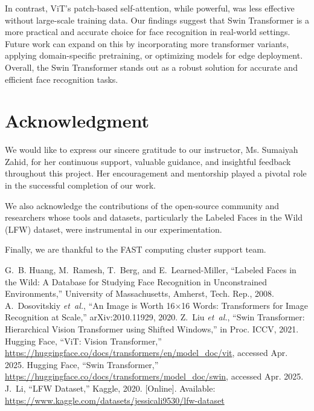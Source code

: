 \documentclass[twocolumn]{IEEEtran}
\begin{document}
In contrast, ViT’s patch-based self-attention, while powerful, was less effective without large-scale training data. Our findings suggest that Swin Transformer is a more practical and accurate choice for face recognition in real-world settings. Future work can expand on this by incorporating more transformer variants, applying domain-specific pretraining, or optimizing models for edge deployment. Overall, the Swin Transformer stands out as a robust solution for accurate and efficient face recognition tasks.



\section*{Acknowledgment}
\setlength{\parindent}{0pt}
We would like to express our sincere gratitude to our instructor, Ms. Sumaiyah Zahid, for her continuous support, valuable guidance, and insightful feedback throughout this project. Her encouragement and mentorship played a pivotal role in the successful completion of our work.

We also acknowledge the contributions of the open-source community and researchers whose tools and datasets, particularly the Labeled Faces in the Wild (LFW) dataset, were instrumental in our experimentation.

Finally, we are thankful to the FAST computing cluster support team.


\begin{thebibliography}{10}
 G.~B. Huang, M.~Ramesh, T.~Berg, and E.~Learned-Miller, “Labeled Faces in the Wild: A Database for Studying Face Recognition in Unconstrained Environments,” University of Massachusetts, Amherst, Tech. Rep., 2008.
 A.~Dosovitskiy \emph{et~al.}, “An Image is Worth 16×16 Words: Transformers for Image Recognition at Scale,” arXiv:2010.11929, 2020.
 Z.~Liu \emph{et~al.}, “Swin Transformer: Hierarchical Vision Transformer using Shifted Windows,” in Proc. ICCV, 2021.
 Hugging Face, “ViT: Vision Transformer,” \url{https://huggingface.co/docs/transformers/en/model_doc/vit}, accessed Apr. 2025.
 Hugging Face, “Swin Transformer,” \url{https://huggingface.co/docs/transformers/model_doc/swin}, accessed Apr. 2025.
 J.~Li, “LFW Dataset,” Kaggle, 2020. [Online]. Available: \url{https://www.kaggle.com/datasets/jessicali9530/lfw-dataset}
\end{thebibliography}
\end{document}
